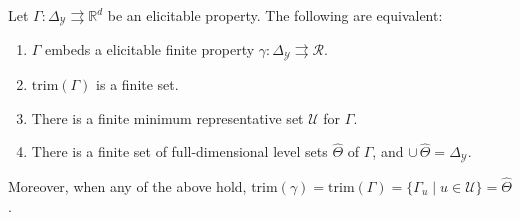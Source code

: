 \documentclass[twoside,11pt]{article}
\newcommand{\Comments}{1}
\newcommand{\mytodo}[2]{\ifnum\Comments=1%
  \todo[linecolor=#1!80!black,backgroundcolor=#1,bordercolor=#1!80!black]{#2}\fi}
\newcommand{\raft}[1]{\mytodo{green!20!white}{RF: #1}}
\newcommand{\jessiet}[1]{\mytodo{teal!20!white}{JF: #1}}
\newcommand{\reals}{\mathbb{R}}
\newcommand{\simplex}{\Delta_\Y}
\newcommand{\R}{\mathcal{R}}
\newcommand{\U}{\mathcal{U}}
\newcommand{\Y}{\mathcal{Y}}
\newcommand{\toto}{\rightrightarrows}
\newcommand{\trimred}{\mathrm{trim}}
\begin{document}
\begin{proposition}\label{prop:embed-trim}
  Let $\Gamma:\simplex\toto\reals^d$ be an elicitable property.
  The following are equivalent:
  \begin{enumerate}\setlength{\itemsep}{0pt}
  \item $\Gamma$ embeds a elicitable finite property $\gamma:\simplex \toto \R$.
  \item $\trimred(\Gamma)$ is a finite set.%
  \item There is a finite minimum representative set $\U$ for $\Gamma$.
  \item There is a finite set of full-dimensional level sets $\hat\Theta$ of $\Gamma$, and $\cup\,\hat\Theta = \simplex$.
  \end{enumerate}
  Moreover, when any of the above hold, $\trimred(\gamma) = \trimred(\Gamma) = \{\Gamma_u \mid u\in\U\} = \hat\Theta$.
\end{proposition}
\end{document}
